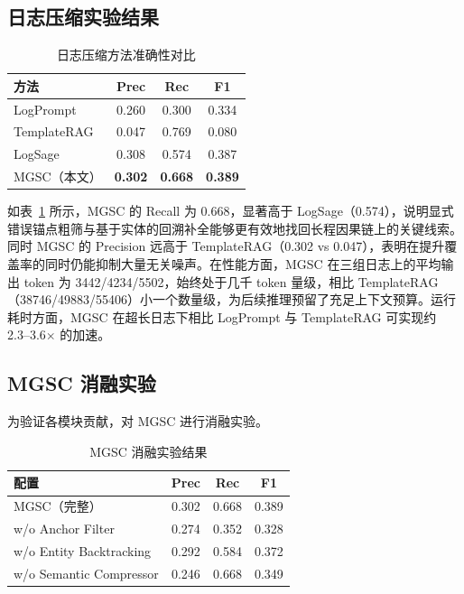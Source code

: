 \documentclass[10pt,conference]{IEEEtran}
\begin{document}
\subsection{日志压缩实验结果}

\begin{table}[htbp]
\centering
\caption{日志压缩方法准确性对比}
\label{tab:mgsc-results}
\begin{tabular}{lccc}
\hline
\textbf{方法} & \textbf{Prec} & \textbf{Rec} & \textbf{F1} \\
\hline
LogPrompt & 0.260 & 0.300 & 0.334 \\
TemplateRAG & 0.047 & 0.769 & 0.080 \\
LogSage & 0.308 & 0.574 & 0.387 \\
MGSC（本文） & \textbf{0.302} & \textbf{0.668} & \textbf{0.389} \\
\hline
\end{tabular}
\end{table}

如表~\ref{tab:mgsc-results} 所示，MGSC 的 Recall 为 0.668，显著高于 LogSage（0.574），说明显式错误锚点粗筛与基于实体的回溯补全能够更有效地找回长程因果链上的关键线索。同时 MGSC 的 Precision 远高于 TemplateRAG（0.302 vs 0.047），表明在提升覆盖率的同时仍能抑制大量无关噪声。在性能方面，MGSC 在三组日志上的平均输出 token 为 3442/4234/5502，始终处于几千 token 量级，相比 TemplateRAG（38746/49883/55406）小一个数量级，为后续推理预留了充足上下文预算。运行耗时方面，MGSC 在超长日志下相比 LogPrompt 与 TemplateRAG 可实现约 2.3--3.6$\times$ 的加速。

\subsection{MGSC 消融实验}

为验证各模块贡献，对 MGSC 进行消融实验。

\begin{table}[htbp]
\centering
\caption{MGSC 消融实验结果}
\label{tab:mgsc-ablation}
\begin{tabular}{lccc}
\hline
\textbf{配置} & \textbf{Prec} & \textbf{Rec} & \textbf{F1} \\
\hline
MGSC（完整） & 0.302 & 0.668 & 0.389 \\
w/o Anchor Filter & 0.274 & 0.352 & 0.328 \\
w/o Entity Backtracking & 0.292 & 0.584 & 0.372 \\
w/o Semantic Compressor & 0.246 & 0.668 & 0.349 \\
\hline
\end{tabular}
\end{table}
\end{document}
